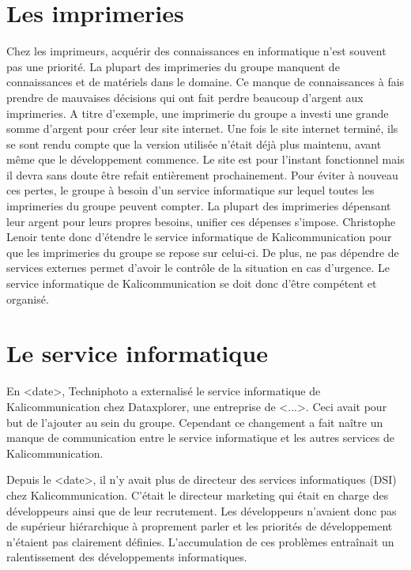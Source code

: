 
\section{Les imprimeries}
Chez les imprimeurs, acquérir des connaissances en informatique n'est souvent pas une priorité. La plupart des imprimeries du groupe manquent de connaissances et de matériels dans le domaine. Ce manque de connaissances à fais prendre de mauvaises décisions qui ont fait perdre beaucoup d'argent aux imprimeries.\newline
A titre d'exemple, une imprimerie du groupe a investi une grande somme d'argent pour créer leur site internet. Une fois le site internet terminé, ils se sont rendu compte que la version utilisée n'était déjà plus maintenu, avant même que le développement commence. Le site est pour l'instant fonctionnel mais il devra sans doute être refait entièrement prochainement.\newline
Pour éviter à nouveau ces pertes, le groupe à besoin d'un service informatique sur lequel toutes les imprimeries du groupe peuvent compter. La plupart des imprimeries dépensant leur argent pour leurs propres besoins, unifier ces dépenses s'impose. Christophe Lenoir tente donc d'étendre le service informatique de Kalicommunication pour que les imprimeries du groupe se repose sur celui-ci. De plus, ne pas dépendre de services externes permet d'avoir le contrôle de la situation en cas d'urgence. Le service informatique de Kalicommunication se doit donc d'être compétent et organisé.

\section{Le service informatique}
En <date>, Techniphoto a externalisé le service informatique de Kalicommunication chez Dataxplorer, une entreprise de <...>. Ceci avait pour but de l'ajouter au sein du groupe. Cependant ce changement a fait naître un manque de communication entre le service informatique et les autres services de Kalicommunication.

Depuis le <date>, il n'y avait plus de directeur des services informatiques (DSI) chez Kalicommunication. C'était le directeur marketing qui était en charge des développeurs ainsi que de leur recrutement. Les développeurs n'avaient donc pas de supérieur hiérarchique à proprement parler et les priorités de développement n'étaient pas clairement définies. L'accumulation de ces problèmes entraînait un ralentissement des développements informatiques.

